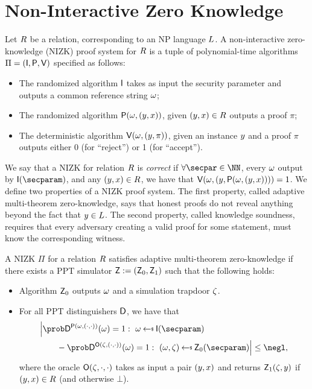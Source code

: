 \section{Non-Interactive Zero Knowledge}
Let $R$ be a relation, corresponding to an NP language $L$.
A non-interactive zero-knowledge (NIZK) proof system for $R$
is a tuple of polynomial-time algorithms $\Pi = (\mathsf{I}, \mathsf{P}, \mathsf{V})$ specified as follows:
\begin{itemize}
    \item The randomized algorithm $\mathsf{I}$ takes as input the security parameter and outputs a common reference string $\omega$;
    \item The randomized algorithm $\mathsf{P}(\omega,(y,x))$, given $(y,x) \in R$ outputs a proof $\pi$;
    \item The deterministic algorithm $\mathsf{V}(\omega,(y,\pi))$, given an instance $y$ and a proof $\pi$ outputs either 0 (for ``reject'') or 1 (for ``accept'').
\end{itemize}
We say that a NIZK for relation $R$ is {\em correct} if $\forall \secpar\in\NN$, every $\omega$ output by $\init(\secparam)$, and any $(y,x) \in R$, we have that $\mathsf{V}(\omega,(y, \mathsf{P}(\omega, (y,x))))=1$.
\newline\newline
We define two properties of a NIZK proof system.
The first property, called adaptive multi-theorem zero-knowledge, says that honest proofs do not reveal anything beyond the fact that $y\in L$.
The second property, called
knowledge soundness, requires that every adversary creating a valid proof for some statement, must know the corresponding witness.

\begin{definition}\label{def:nizk_zk}
    A NIZK $\Pi$ for a relation $R$ satisfies adaptive multi-theorem zero-knowledge
    if there exists a PPT simulator $\mathsf{Z} := (\mathsf{Z}_0,\mathsf{Z}_1)$ such that the following holds:
    \begin{itemize}
        \item
              Algorithm $\mathsf{Z}_0$ outputs $\omega$ and a simulation trapdoor $\zeta$.
        \item
              For all PPT distinguishers $\mathsf{D}$, we have that
              \begin{align*}
                   & \Big\lvert
                  \Prob{\ddv^{\prover(\crs,(\cdot,\cdot))}(\crs)=1:~\crs\getsr\init(\secparam)}                                 \\
                   & \qquad - \Prob{\ddv^{\advSOracle(\tpsim,(\cdot,\cdot))}(\crs)=1:~(\crs,\tpsim)\getsr\nizksim_0(\secparam)}
                  \Big\rvert \le \negl,
              \end{align*}
              where the oracle $\mathsf{O}(\zeta,\cdot,\cdot)$ takes as input a pair $(y,x)$ and returns $\mathsf{Z}_1(\zeta,y)$ if $(y,x)\in R$ (and otherwise  $\bot$).
    \end{itemize}
\end{definition}

